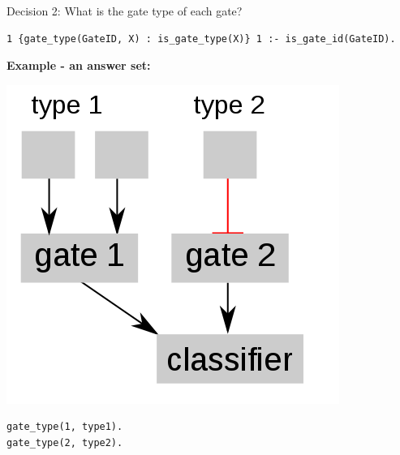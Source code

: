 \documentclass[10pt,dvipsnames]{beamer}
\begin{document}
\begin{frame}[fragile]{Decision 2: What is the gate type of each gate?}
\small
\begin{verbatim}
1 {gate_type(GateID, X) : is_gate_type(X)} 1 :- is_gate_id(GateID).
\end{verbatim}
\vspace{1.3cm}
{\large \color{orange} \textbf{Example - an answer set:}}
\vspace{0.5cm}

\begin{minipage}{0.45\textwidth}
\begin{center}
\includegraphics[scale=0.3]{exp2.png}
\end{center}
\end{minipage}
\hfill
\begin{minipage}{0.45\textwidth}
\begin{verbatim}
gate_type(1, type1).
gate_type(2, type2).
\end{verbatim}
\end{minipage}
\end{frame}
\end{document}
